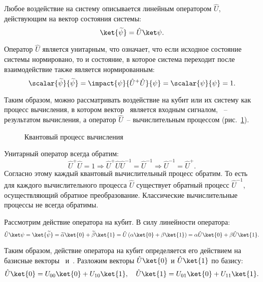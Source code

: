\documentclass[pscyr,notitlepage]{hedwork}
\newcommand{\pic}[1]{\ref{pic:#1}}
\renewcommand{\~}[1]{\widetilde{#1}}
\newcommand{\lb}{\left(}
\newcommand{\rb}{\right)}
\begin{document}
  Любое воздействие на систему описывается линейным оператором \( \hat{U} \),
  действующим на вектор состояния системы:
  \[
    \ket{\~\psi} = \hat{U}\ket\psi.
  \]
  
  Оператор \( \hat{U} \) является унитарным, что означает, что если исходное
  состояние системы нормировано, то и состояние, в которое система переходит
  после взаимодействие также является нормированным:
  \[
    \scalar{\~\psi}{\~\psi} = \impact{\psi}{\hat{U}^+\hat{U}}{\psi} =
      \scalar{\psi}{\psi} = 1.
  \]
  
  Таким образом, можно рассматривать воздействие на кубит или их систему как
  процесс вычисления, в котором вектор~\ket{\psi} является входным сигналом,
  \ket{\~\psi}~-- результатом вычисления, а оператор \( \hat{U} \)~--
  вычислительным процессом (рис.~\pic{3}).
  \begin{figure}[h!]
    \center
    \caption{Квантовый процесс вычисления}
    \label{pic:3}
  \end{figure}
  
  Унитарный оператор всегда обратим:
  \[
    \hat{U}^+\hat{U} = 1 \Rightarrow
      \hat{U}^+\hat{U}\hat{U}^{-1} = \hat{U}^{-1} \Rightarrow
      \hat{U}^{-1} = \hat{U}^+.
  \]
  Согласно этому каждый квантовый вычислительный процесс обратим. То есть для
  каждого вычислительного процесса \( \hat{U} \) существует обратный процесс
  \( \hat{U}^{-1} \), осуществляющий обратное преобразование. Классические
  вычислительные процессы не всегда обратимы.
  
  Рассмотрим действие оператора на кубит. В силу линейности оператора:
  \begin{equation}
    \hat{U}\ket\psi = \ket{\~\psi} = \~\alpha\ket{0} + \~\beta\ket{1} =
      \hat{U}\lb\alpha\ket{0} + \beta\ket{1}\rb =
      \alpha\hat{U}\ket{0} + \beta\hat{U}\ket{1}.
    \label{eq:1.15}
  \end{equation}
  
  Таким образом, действие оператора на кубит определяется его действием на
  базисные векторы~ и~. Разложим векторы \( \hat{U}\ket{0} \) и
  \( \hat{U}\ket{1} \) по базису:
  \begin{equation}
    \hat{U}\ket{0} = U_{00}\ket{0} + U_{10}\ket{1}, \quad
      \hat{U}\ket{1} = U_{01}\ket{0} + U_{11}\ket{1}.
    \label{eq:1.16}
  \end{equation}
  
\end{document}
